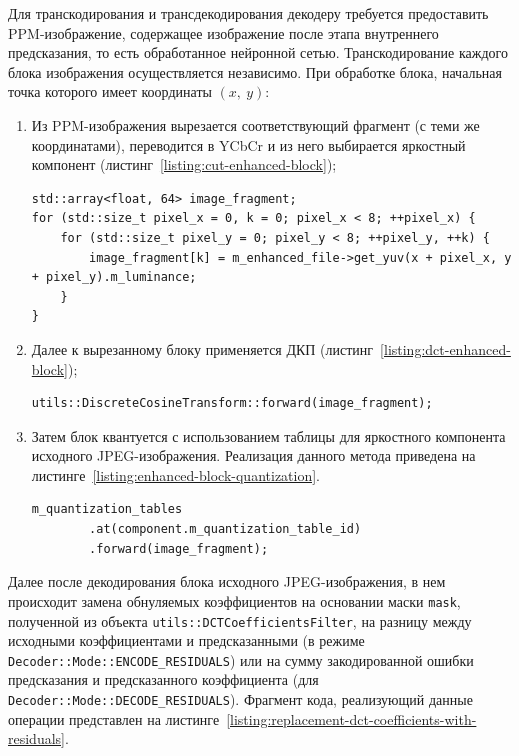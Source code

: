 \documentclass[times,specification,annotation]{itmo-student-thesis}
\begin{document}
Для транскодирования и трансдекодирования декодеру требуется предоставить PPM-изображение, содержащее изображение после этапа внутреннего предсказания, то есть обработанное нейронной сетью. Транскодирование каждого блока изображения осуществляется независимо. При обработке блока, начальная точка которого имеет координаты $(x,\ y)$:
\begin{enumerate}
    \item Из PPM-изображения вырезается соответствующий фрагмент (с теми же координатами), переводится в YCbCr и из него выбирается яркостный компонент (листинг~\ref{listing:cut-enhanced-block});
          \begin{lstlisting}[float=!h,caption={Получение фрагмента изображения после внутреннего предсказания},label={listing:cut-enhanced-block}]
std::array<float, 64> image_fragment;
for (std::size_t pixel_x = 0, k = 0; pixel_x < 8; ++pixel_x) {
    for (std::size_t pixel_y = 0; pixel_y < 8; ++pixel_y, ++k) {
        image_fragment[k] = m_enhanced_file->get_yuv(x + pixel_x, y + pixel_y).m_luminance;
    }
}
    \end{lstlisting}
    \item Далее к вырезанному блоку применяется ДКП (листинг~\ref{listing:dct-enhanced-block});
          \begin{lstlisting}[caption={Применение прямого ДКП},label={listing:dct-enhanced-block}]
utils::DiscreteCosineTransform::forward(image_fragment);
    \end{lstlisting}
    \item Затем блок квантуется с использованием таблицы для яркостного компонента исходного JPEG-изображения. Реализация данного метода приведена на листинге~\ref{listing:enhanced-block-quantization}.
          \begin{lstlisting}[caption={Квантование блока},label={listing:enhanced-block-quantization}]
m_quantization_tables
        .at(component.m_quantization_table_id)
        .forward(image_fragment);
    \end{lstlisting}
\end{enumerate}

Далее после декодирования блока исходного JPEG-изображения, в нем происходит замена обнуляемых коэффициентов на основании маски \texttt{mask}, полученной из объекта \texttt{utils::DCTCoefficientsFilter}, на разницу между исходными коэффициентами и предсказанными (в режиме \texttt{Decoder::Mode::ENCODE\_RESIDUALS}) или на сумму закодированной ошибки предсказания и предсказанного коэффициента (для \texttt{Decoder::Mode::DECODE\_RESIDUALS}). Фрагмент кода, реализующий данные операции представлен на листинге~\ref{listing:replacement-dct-coefficients-with-residuals}.
\end{document}
